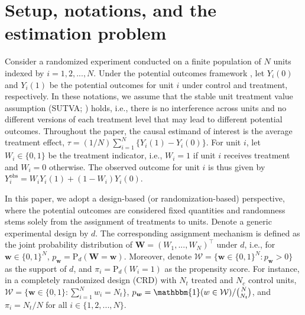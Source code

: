 \documentclass[12pt]{article}
\renewcommand{\Pr}{{\text{P}}}
\begin{document}
\section{Setup, notations, and the estimation problem}
\label{sec_setup}

Consider a randomized experiment conducted on a finite population of $N$ units indexed by $i = 1,2,...,N$. Under the potential outcomes framework \cite{neyman1923application, rubin1974estimating}, let $Y_i(0)$ and $Y_i(1)$ be the potential outcomes for unit $i$ under control and treatment, respectively. In these notations, we assume that the stable unit treatment value assumption (SUTVA; \cite{rubin1980randomization}) holds, i.e., there is no interference across units and no different versions of each treatment level that may lead to different potential outcomes. Throughout the paper, the causal estimand of interest is the average treatment effect, $\tau = (1/N)\sum_{i=1}^{N}\{Y_i(1) - Y_i(0)\}.$
For unit $i$, let $W_i \in \{0,1\}$ be the treatment indicator, i.e., $W_i = 1$ if unit $i$ receives treatment and $W_i = 0$ otherwise. The observed outcome for unit $i$ is thus given by $Y^{\text{obs}}_i  =W_iY_i(1) + (1-W_i)Y_i(0)$. 

In this paper, we adopt a design-based (or randomization-based) perspective, where the potential outcomes are considered fixed quantities and randomness stems solely from the assignment of treatments to units.
Denote a generic experimental design by $d$. The corresponding assignment mechanism is defined as the joint probability distribution of $\bm{W} = (W_1,...,W_N)^\top$ under $d$, i.e., for $\bm{w} \in \{0,1\}^N$, $p_{\bm{w}} = \Pr_d(\bm{W} = \bm{w})$.
Moreover, denote $\mathcal{W} = \{\bm{w}\in \{0,1\}^N: p_{\bm{w}}>0\}$ as the support of $d$, and $\pi_i = \Pr_d(W_i = 1)$ as the propensity score.
For instance, in a completely randomized design (CRD) with $N_t $ treated and $N_c$ control units, $\mathcal{W} = \{\bm{w}\in \{0,1\}: \sum_{i=1}^{N}w_i = N_t\}$, $p_{\bm{w}} = \mathbbm{1}(w\in \mathcal{W})/\binom{N}{N_t}$, and $\pi_i = N_t/N$ for all $i \in \{1,2,...,N\}$.   
\end{document}
